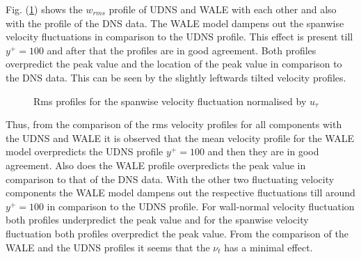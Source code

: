 Fig. (\ref{wrms udns vs wale}) shows the $w_{rms}$ profile of UDNS and WALE with each other  and also with the profile of the DNS data. The WALE model dampens out the spanwise velocity fluctuations in comparison to the UDNS profile. This effect is present till $y^+ = 100$ and after that the profiles are in good agreement. Both profiles overpredict the peak value and the location of the peak value in comparison to the DNS data. This can be seen by the slightly leftwards tilted velocity profiles.
%
\begin{figure}[h!]
\begin{minipage}[b]{0.5\textwidth}
\end{minipage}
%
\begin{minipage}[b]{0.5\textwidth}
\end{minipage}
\caption{Rms profiles for the spanwise velocity fluctuation normalised by $u_\tau$}
\label{wrms udns vs wale}
\end{figure} 
%

Thus, from the comparison of the rms velocity profiles for all components with the UDNS and WALE it is observed that the mean velocity profile for the WALE model overpredicts the UDNS profile $y^+ = 100$ and then they are in good agreement. Also does the WALE profile overpredicts the peak value in comparison to that of the DNS data. With the other two fluctuating velocity components the WALE model dampens out the respective fluctuations till around $y^+ = 100$ in comparison to the UDNS profile. For wall-normal velocity fluctuation both profiles underpredict the peak value and for the spanwise velocity fluctuation both profiles overpredict the peak value. From the comparison of the WALE and the UDNS profiles it seems that the $\nu_t$ has a minimal effect.

